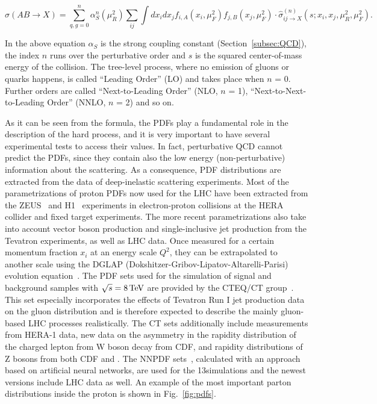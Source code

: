 \begin{equation}
\sigma(AB \to X) = \sum_{q,g=0}^{n} \alpha_S^n(\mu_R^2)\sum_{ij}\int dx_i dx_j f_{i,A}(x_i,\mu_F^2) f_{j,B}(x_j,\mu_F^2) \cdot \hat{\sigma}^{(n)}_{ij\to X}(s;x_i,x_j,\mu_R^2,\mu_F^2).
\end{equation}

In the above equation $\alpha_S$ is the strong coupling constant (Section~\ref{subsec:QCD}), the index $n$ runs over the perturbative order and $s$ is the squared center-of-mass energy of the collision.
The tree-level process, where no emission of gluons or quarks happens, is called ``Leading Order'' (LO) and takes place when $n$ = 0.
Further orders are called ``Next-to-Leading Order'' (NLO, $n$ = 1), ``Next-to-Next-to-Leading Order'' (NNLO, $n$ = 2) and so on.

As it can be seen from the formula, the PDFs play a fundamental role in the description of the hard process, and it is very important to have several experimental tests to access their values.
In fact, perturbative QCD cannot predict the PDFs, since they contain also the low energy (non-perturbative) information about the scattering.
As a consequence, PDF distributions are extracted from the data of deep-inelastic scattering experiments.
Most of the parametrizations of proton PDFs now used for the LHC have been extracted from the ZEUS~\cite{ZEUS:1993aa} and H1~\cite{ABT1997310} experiments in electron-proton collisions at the HERA collider and fixed target experiments.
The more recent parametrizations also take into account vector boson production and single-inclusive jet production from the Tevatron experiments, as well as LHC data.
Once measured for a certain momentum fraction $x_i$ at an energy scale $Q^2$, they can be extrapolated to another scale using the DGLAP (Dokshitzer-Gribov-Lipatov-Altarelli-Parisi) evolution equation~\cite{ALTARELLI1977298}.
The PDF sets used for the simulation of signal and background samples with $\sqrt{s} = 8\,\text{Te\hspace{-.08em}V}$ are provided by the CTEQ/CT group~\cite{Pumplin:2002vw,Lai:2010vv}. This set especially incorporates the effects of Tevatron Run I jet production data on the gluon distribution and is therefore expected to describe the mainly gluon-based LHC processes realistically. The CT sets additionally include measurements from HERA-1 data, new data on the asymmetry in the rapidity distribution of the charged lepton from W boson decay from CDF, and rapidity distributions of Z bosons from both CDF and \DZERO. The NNPDF sets~\cite{Ball:2011mu}, calculated with an approach based on artificial neural networks, are used for the 13\TeV simulations and the newest versions include LHC data as well.
An example of the most important parton distributions inside the proton is shown in Fig.~\ref{fig:pdfs}.\\

